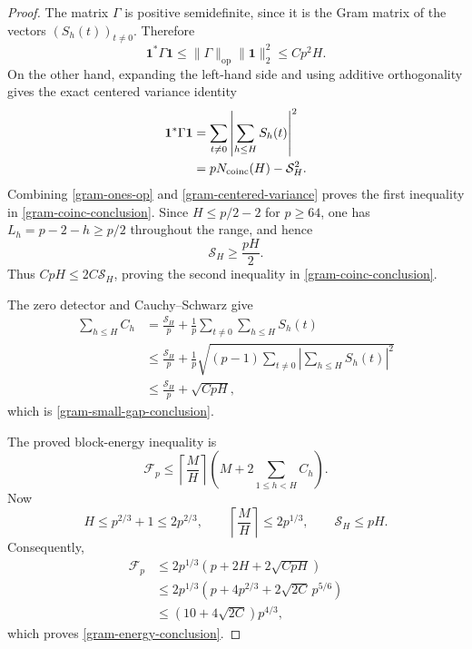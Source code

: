 \begin{proof}
The matrix $\Gamma$ is positive semidefinite, since it is the Gram
matrix of the vectors $(S_h(t))_{t\ne0}$.  Therefore
\begin{equation}
 \mathbf 1^*\Gamma\mathbf 1
 \le\|\Gamma\|_{\mathrm{op}}\|\mathbf 1\|_2^2
 \le Cp^2H.
 \label{gram-ones-op}
\end{equation}
On the other hand, expanding the left-hand side and using additive
orthogonality gives the exact centered variance identity
\begin{align}
 \mathbf 1^*\Gamma\mathbf 1
 &=\sum_{t\ne0}\left|\sum_{h\le H}S_h(t)\right|^2
 \notag\\
 &=pN_{\mathrm{coinc}}(H)-\mathcal S_H^2.
 \label{gram-centered-variance}
\end{align}
Combining \eqref{gram-ones-op} and
\eqref{gram-centered-variance} proves the first inequality in
\eqref{gram-coinc-conclusion}.  Since $H\le p/2-2$ for $p\ge64$, one has
$L_h=p-2-h\ge p/2$ throughout the range, and hence
\[
 \mathcal S_H\ge\frac{pH}{2}.
\]
Thus $CpH\le2C\mathcal S_H$, proving the second inequality in
\eqref{gram-coinc-conclusion}.

The zero detector and Cauchy--Schwarz give
\begin{align*}
 \sum_{h\le H}C_h
 &=\frac{\mathcal S_H}{p}
   +\frac1p\sum_{t\ne0}\sum_{h\le H}S_h(t)\\
 &\le\frac{\mathcal S_H}{p}
   +\frac1p\sqrt{(p-1)
      \sum_{t\ne0}\left|\sum_{h\le H}S_h(t)\right|^2}\\
 &\le\frac{\mathcal S_H}{p}+\sqrt{CpH},
\end{align*}
which is \eqref{gram-small-gap-conclusion}.

The proved block-energy inequality is
\begin{equation}
 \mathcal F_p
 \le\left\lceil\frac{M}{H}\right\rceil
 \left(M+2\sum_{1\le h<H}C_h\right).
 \label{gram-block-energy}
\end{equation}
Now
\[
 H\le p^{2/3}+1\le2p^{2/3},\qquad
 \left\lceil\frac{M}{H}\right\rceil\le2p^{1/3},
 \qquad \mathcal S_H\le pH.
\]
Consequently,
\begin{align*}
 \mathcal F_p
 &\le2p^{1/3}
 \left(p+2H+2\sqrt{CpH}\right)\\
 &\le2p^{1/3}
 \left(p+4p^{2/3}+2\sqrt{2C}\,p^{5/6}\right)\\
 &\le(10+4\sqrt{2C})p^{4/3},
\end{align*}
which proves \eqref{gram-energy-conclusion}.


\end{proof}
